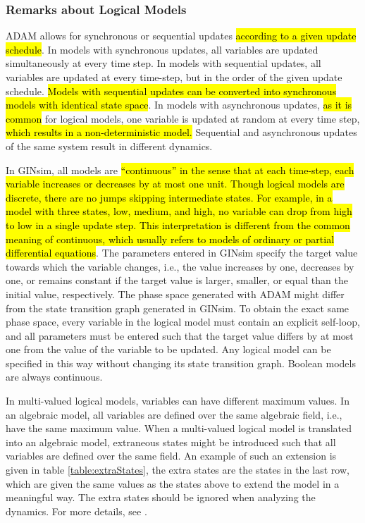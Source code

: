 \documentclass[10pt]{bmc_article}
\newenvironment{bmcformat}{\begin{raggedright}\baselineskip20pt\sloppy\setboolean{publ}{false}}{\end{raggedright}\baselineskip20pt\sloppy}
\begin{document}
\begin{bmcformat}
\subsubsection*{Remarks about Logical Models} 
ADAM allows for synchronous or sequential updates \hl{according to a given update schedule}. In models with synchronous updates, all variables are updated simultaneously at every time step. In models with sequential updates, all variables are updated at every time-step, but in the order of the given update schedule. \hl{Models with sequential updates can be converted into synchronous models with identical state space}. In models with asynchronous updates, \hl{as it is common} for logical models, one variable is updated at random at every time step, \hl{which results in a non-deterministic model.}
Sequential and asynchronous updates of the same system result in different dynamics.

In GINsim, all models are \hl{``continuous'' in the sense that at each time-step, each variable increases or decreases by at most one unit. Though logical models are discrete, there are no jumps skipping intermediate states. For example, in a model with three states, low, medium, and high, no variable can drop from high to low in a single update step. This interpretation is different from the common meaning of continuous, which usually refers to models of ordinary or partial differential equations}. The parameters entered in GINsim specify the target value towards which the variable changes, i.e., the value increases by one, decreases by one, or remains constant if the target value is larger, smaller, or equal than the initial value, respectively. The phase space generated with ADAM might differ from the state transition graph generated in GINsim. To obtain the exact same phase space, every variable in the logical model must contain an explicit self-loop, and all parameters must be entered such that the target value differs by at most one from the value of the variable to be updated. Any logical model can be specified in this way without changing its state transition graph. Boolean models are always continuous.   

In multi-valued logical models, variables can have different maximum values. In an algebraic model, all variables are defined over the same algebraic field, i.e., have the same maximum value. When a multi-valued logical model is translated into an algebraic model, extraneous states might be introduced such that all variables are defined over the same field. An example of such an extension is given in table \ref{table:extraStates}, the extra states are the states in the last row, which are given the same values as the states above to extend the model in a meaningful way. The extra states should be ignored when analyzing the dynamics. For more details, see \cite{Alan:Bioinf2010}.  


\end{bmcformat}
\end{document}
